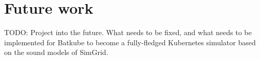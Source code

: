 \chapter{Future work}

TODO: Project into the future. What needs to be fixed, and what needs to be
implemented for Batkube to become a fully-fledged Kubernetes simulator based on
the sound models of SimGrid.
